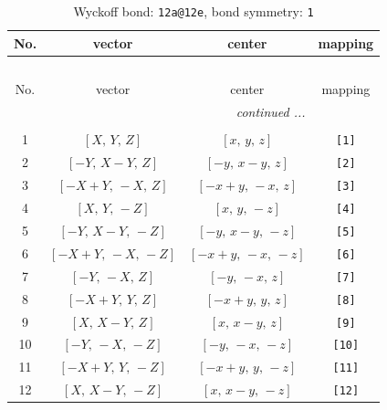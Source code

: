 \documentclass[fleqn,8pt]{jsarticle}
\begin{document}
\begin{longtable}{cccc}
\caption{Wyckoff bond: {\tt 12a@12e}, bond symmetry: {\tt 1}}
 \\
 \hline \hline
No. & vector & center & mapping \\ \hline \endfirsthead

\multicolumn{3}{l}{\tablename\ \thetable{}} \\
 \hline \hline
No. & vector & center & mapping \\ \hline \endhead

 \hline \hline
\multicolumn{3}{r}{\footnotesize\it continued ...} \\ \endfoot

 \hline \hline
\multicolumn{3}{r}{} \\ \endlastfoot

1 & $\left[ X,\, Y,\, Z \right]$ & $\left[ x,\, y,\, z \right]$ & {\tt [1]} \\ \hline
2 & $\left[ - Y,\, X - Y,\, Z \right]$ & $\left[ - y,\, x - y,\, z \right]$ & {\tt [2]} \\ \hline
3 & $\left[ - X + Y,\, - X,\, Z \right]$ & $\left[ - x + y,\, - x,\, z \right]$ & {\tt [3]} \\ \hline
4 & $\left[ X,\, Y,\, - Z \right]$ & $\left[ x,\, y,\, - z \right]$ & {\tt [4]} \\ \hline
5 & $\left[ - Y,\, X - Y,\, - Z \right]$ & $\left[ - y,\, x - y,\, - z \right]$ & {\tt [5]} \\ \hline
6 & $\left[ - X + Y,\, - X,\, - Z \right]$ & $\left[ - x + y,\, - x,\, - z \right]$ & {\tt [6]} \\ \hline
7 & $\left[ - Y,\, - X,\, Z \right]$ & $\left[ - y,\, - x,\, z \right]$ & {\tt [7]} \\ \hline
8 & $\left[ - X + Y,\, Y,\, Z \right]$ & $\left[ - x + y,\, y,\, z \right]$ & {\tt [8]} \\ \hline
9 & $\left[ X,\, X - Y,\, Z \right]$ & $\left[ x,\, x - y,\, z \right]$ & {\tt [9]} \\ \hline
10 & $\left[ - Y,\, - X,\, - Z \right]$ & $\left[ - y,\, - x,\, - z \right]$ & {\tt [10]} \\ \hline
11 & $\left[ - X + Y,\, Y,\, - Z \right]$ & $\left[ - x + y,\, y,\, - z \right]$ & {\tt [11]} \\ \hline
12 & $\left[ X,\, X - Y,\, - Z \right]$ & $\left[ x,\, x - y,\, - z \right]$ & {\tt [12]} \\
\end{longtable}
\end{document}
